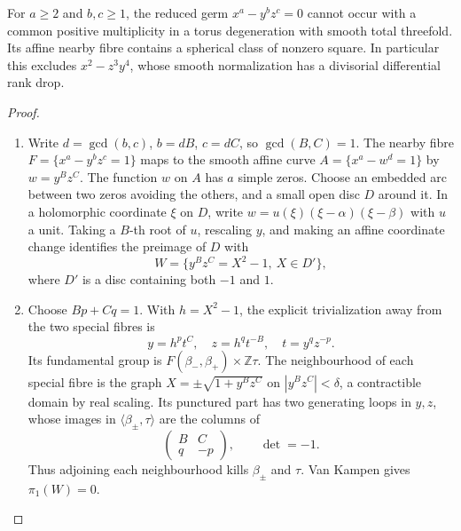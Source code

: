 \begin{proposition}[P4.18]\hypertarget{tag-02WP}{}\label{night:P4.18}\label{stmt:P4.18}

For $a\geq2$ and $b,c\geq1$, the reduced germ
$x^a-y^bz^c=0$ cannot occur with a common positive multiplicity
in a torus degeneration with smooth total threefold. Its affine
nearby fibre contains a spherical class of nonzero square.
In particular this excludes $x^2-z^3y^4$, whose smooth
normalization has a divisorial differential rank drop.
\end{proposition}
\begin{proof}

\begin{enumerate}[label={$\langle1\rangle$\arabic*.},leftmargin=*]
\item Write $d=\gcd(b,c)$, $b=dB$, $c=dC$, so $\gcd(B,C)=1$.
The nearby fibre $F=\{x^a-y^bz^c=1\}$ maps to the smooth
affine curve $A=\{x^a-w^d=1\}$ by $w=y^Bz^C$.
The function $w$ on $A$ has $a$ simple zeros. Choose an
embedded arc between two zeros avoiding the others, and a
small open disc $D$ around it. In a holomorphic coordinate
$\xi$ on $D$, write $w=u(\xi)(\xi-\alpha)(\xi-\beta)$
with $u$ a unit. Taking a $B$-th root of $u$, rescaling $y$,
and making an affine coordinate change identifies the preimage
of $D$ with
\[
 W=\{y^Bz^C=X^2-1,\ X\in D'\},
\]
where $D'$ is a disc containing both $-1$ and $1$.

\item Choose $Bp+Cq=1$. With $h=X^2-1$, the explicit trivialization
away from the two special fibres is
\[
 y=h^pt^C,\quad z=h^qt^{-B},\quad t=y^qz^{-p}.
\]
Its fundamental group is $F(\beta_-,\beta_+)\times\mathbb Z\tau$.
The neighbourhood of each special fibre is the graph
$X=\pm\sqrt{1+y^Bz^C}$ on $|y^Bz^C|<\delta$, a contractible
domain by real scaling. Its punctured part has two generating
loops in $y,z$, whose images in $\langle\beta_\pm,\tau\rangle$
are the columns of
\[
 \begin{pmatrix}B&C\\q&-p\end{pmatrix},\qquad \det=-1.
\]
Thus adjoining each neighbourhood kills $\beta_\pm$ and $\tau$.
Van Kampen gives $\pi_1(W)=0$.


\end{enumerate}
\end{proof}
